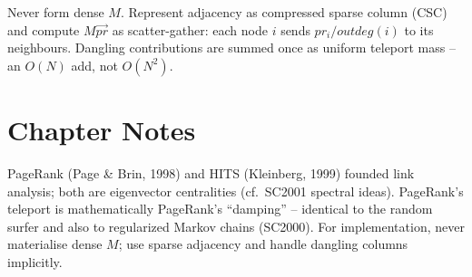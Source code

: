 \begin{remark}
Never form dense $M$. Represent adjacency as compressed sparse column (CSC) and compute $M\vec{pr}$ as scatter-gather: each node $i$ sends $pr_i/outdeg(i)$ to its neighbours. Dangling contributions are summed once as uniform teleport mass -- an $O(N)$ add, not $O(N^2)$.
\end{remark}

\section{Chapter Notes}
PageRank (Page \& Brin, 1998) and HITS (Kleinberg, 1999) founded link analysis; both are eigenvector centralities (cf.\ SC2001 spectral ideas). PageRank's teleport is mathematically PageRank's ``damping'' -- identical to the random surfer and also to regularized Markov chains (SC2000). For implementation, never materialise dense $M$; use sparse adjacency and handle dangling columns implicitly.

